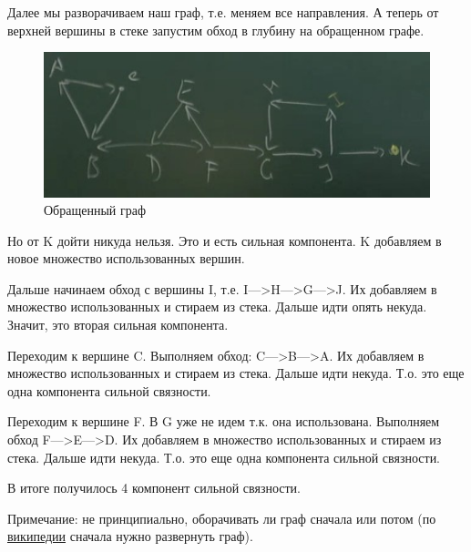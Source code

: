 Далее мы разворачиваем наш граф, т.е. меняем все направления. А теперь от верхней вершины в стеке запустим обход в глубину на обращенном графе.

\begin{figure}[h!]
	\centering
	\includegraphics[width=0.5\linewidth]{lection_18/kos3}
	\caption{Обращенный граф}
\end{figure}

Но от K дойти никуда нельзя. Это и есть сильная компонента. K добавляем в новое множество использованных вершин. 

Дальше начинаем обход с вершины I, т.е. I--->H--->G--->J. Их добавляем в множество использованных и стираем из стека. Дальше идти опять некуда. Значит, это вторая сильная компонента.

Переходим к вершине C. Выполняем обход: C--->B--->A. Их добавляем в множество использованных и стираем из стека. Дальше идти некуда. Т.о. это еще одна компонента сильной связности.

Переходим к вершине F. В G уже не идем т.к. она использована. Выполняем обход F--->E--->D. Их добавляем в множество использованных и стираем из стека. Дальше идти некуда. Т.о. это еще одна компонента сильной связности.

В итоге получилось 4 компонент сильной связности.

Примечание: не принципиально, оборачивать ли граф сначала или потом (по \href{https://ru.wikipedia.org/wiki/%D0%90%D0%BB%D0%B3%D0%BE%D1%80%D0%B8%D1%82%D0%BC_%D0%9A%D0%BE%D1%81%D0%B0%D1%80%D0%B0%D0%B9%D1%8E}{википедии} сначала нужно развернуть граф).